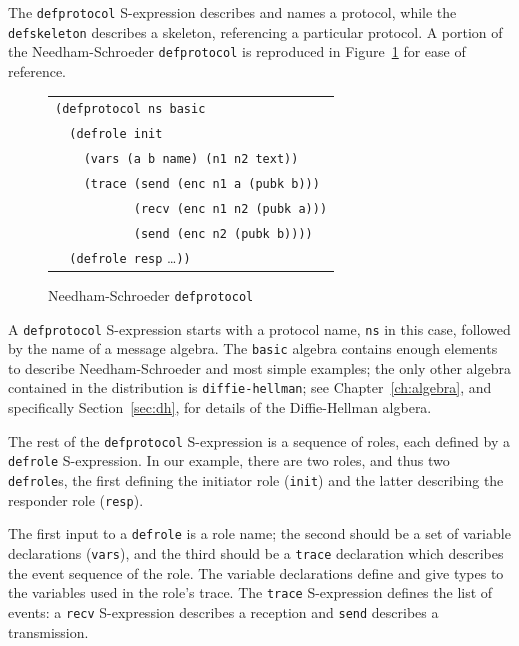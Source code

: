 The \texttt{defprotocol} S-expression describes and names a protocol,
while the \texttt{defskeleton} describes a skeleton, referencing a
particular protocol.  A portion of the Needham-Schroeder
\texttt{defprotocol} is reproduced in Figure~\ref{fig:ns defprotocol}
for ease of reference.

\begin{figure}
\begin{center}
\begin{tabular}{l}
\verb|(defprotocol ns basic|\\
\verb|  (defrole init|\\
\verb|    (vars (a b name) (n1 n2 text))|\\
\verb|    (trace (send (enc n1 a (pubk b)))|\\
\verb|           (recv (enc n1 n2 (pubk a)))|\\
\verb|           (send (enc n2 (pubk b))))|\\
\verb|  (defrole resp| \ldots\texttt{))}
\end{tabular}
\end{center}
\caption{Needham-Schroeder \texttt{defprotocol}}
\label{fig:ns defprotocol}
\end{figure}

 A \texttt{defprotocol} S-expression starts with a protocol
name, \texttt{ns} in this case, followed by the name of a message
algebra.  The \texttt{basic} algebra contains enough elements to
describe Needham-Schroeder and most simple examples; the only other
algebra contained in the {\cpsa} distribution is
\texttt{diffie-hellman}; see Chapter~\ref{ch:algebra}, and
specifically Section~\ref{sec:dh}, for details of the Diffie-Hellman
algbera.

 The rest of the \texttt{defprotocol} S-expression is
a sequence of roles, each defined by a \texttt{defrole} S-expression.
In our example, there are two roles, and thus two \texttt{defrole}s,
the first defining the initiator role (\texttt{init}) and the latter
describing the responder role (\texttt{resp}).

    The first
input to a \texttt{defrole} is a role name; the second should be a set
of variable declarations (\texttt{vars}), and the third should be a
\texttt{trace} declaration which describes the event sequence of the
role.  The variable declarations define and give types to the
variables used in the role's trace.  The \texttt{trace} S-expression
defines the list of events: a \texttt{recv} S-expression describes a
reception and \texttt{send} describes a transmission.

